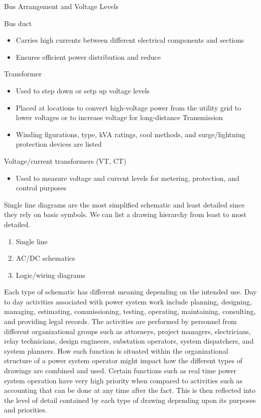 Bus Arrangement and Voltage Levels
\begin{define}
    Bus duct  
    \begin{itemize}
        \item Carries high currents between different electrical components and sections
        \item Ensures efficient power distribution and reduce
    \end{itemize}
    Transformer 
    \begin{itemize}
        \item Used to step down or setp up voltage levels
        \item Placed at locations to convert high-voltage power from the utility grid to lower voltages or to increase voltage for long-distance Transmission
        \item Winding figurations, type, kVA ratings, cool methods, and surge/lightning protection devices are listed
    \end{itemize}
    Voltage/current transformers (VT, CT)
    \begin{itemize}
        \item Used to measure voltage and current levels for metering, protection, and control purposes
    \end{itemize}
\end{define}

Single line diagrams are the most simplified schematic and least detailed since they rely on basic symbols. We can list a drawing hierarchy from least to most detailed.
\begin{enumerate}
    \item Single line
    \item AC/DC schematics
    \item Logic/wiring diagrams
\end{enumerate}
Each type of schematic has different meaning depending on the intended use. Day to day activities associated with power system work include planning, designing, managing, estimating, commissioning, testing, operating, maintaining, consulting, and providing legal records. The activities are performed by personnel from different organizational groups such as attorneys, project managers, electricians, relay technicians, design engineers, substation operators, system dispatchers, and system planners. How each function is situated within the organizational structure of a power system operator might impact how the different types of drawings are combined and used. Certain functions such as real time power system operation have very high priority when compared to activities such as accounting that can be done at any time after the fact. This is then reflected into the level of detail contained by each type of drawing depending upon its purposes and priorities.

